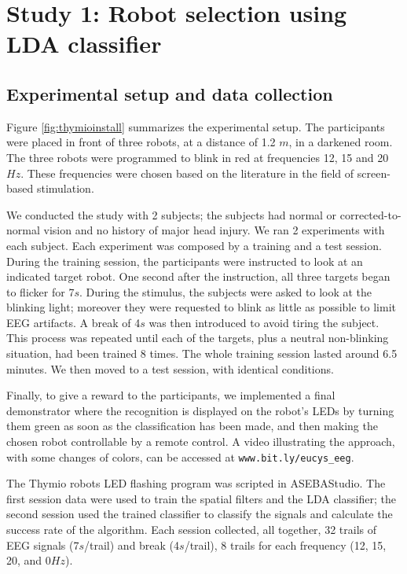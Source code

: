 \documentclass{svmult}
\begin{document}
\section{Study 1: Robot selection using LDA classifier}
\label{sec:ML_approach}

\subsection{Experimental setup and data collection}
Figure \ref{fig:thymioinstall} summarizes the experimental setup. 
The participants were placed in front of three robots, at a distance of 1.2 $m$, in a darkened room. The three robots were programmed to blink in red at frequencies 12, 15 and 20$Hz$. These frequencies were chosen based on the literature in the field of screen-based stimulation.

We conducted the study with 2 subjects; the subjects had normal or corrected-to-normal vision and no history of major head injury. We ran 2 experiments with each subject. 
Each experiment was composed by a training and a test session.
During the training session, the participants were instructed to look at an indicated target robot. One second after the instruction, all three targets began to flicker for 7$s$. During the stimulus, the subjects were asked to look at the blinking light; moreover they were requested to blink as little as possible to limit EEG artifacts. A break of 4$s$ was then introduced to avoid tiring the subject. This process was repeated until each of the targets, plus a neutral non-blinking situation, had been trained 8 times. The whole training session lasted around 6.5 minutes. 
We then moved to a test session, with identical conditions. 

Finally, to give a reward to the participants, we implemented a final demonstrator where the recognition is displayed on the robot's LEDs by turning them green as soon as the classification has been made, and then making the chosen robot controllable by a remote control. A video illustrating the approach, with some changes of colors, can be accessed at \verb"www.bit.ly/eucys_eeg". 

The Thymio robots LED flashing program was scripted in ASEBAStudio. The first session data were used to train the spatial filters and the LDA classifier; the second session used the trained classifier to classify the signals and calculate the success rate of the algorithm. Each session collected, all together, 32 trails of EEG signals (7$s$/trail) and break (4$s$/trail), 8 trails for each frequency (12, 15, 20, and 0$Hz$). 
\end{document}
